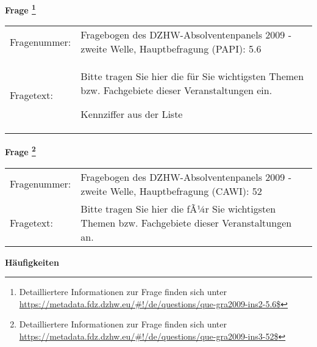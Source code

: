 				\vspace*{0.5cm}
                \noindent\textbf{Frage
	                \footnote{Detailliertere Informationen zur Frage finden sich unter
		              \url{https://metadata.fdz.dzhw.eu/\#!/de/questions/que-gra2009-ins2-5.6$}}}\\
				\begin{tabularx}{\hsize}{@{}lX}
					Fragenummer: &
					  Fragebogen des DZHW-Absolventenpanels 2009 - zweite Welle, Hauptbefragung (PAPI):
					  5.6
 \\
					Fragetext: & Bitte tragen Sie hier die für Sie wichtigsten Themen bzw. Fachgebiete dieser Veranstaltungen ein.\par  Kennziffer aus der Liste \\
				\end{tabularx}
				\vspace*{0.5cm}
                \noindent\textbf{Frage
	                \footnote{Detailliertere Informationen zur Frage finden sich unter
		              \url{https://metadata.fdz.dzhw.eu/\#!/de/questions/que-gra2009-ins3-52$}}}\\
				\begin{tabularx}{\hsize}{@{}lX}
					Fragenummer: &
					  Fragebogen des DZHW-Absolventenpanels 2009 - zweite Welle, Hauptbefragung (CAWI):
					  52
 \\
					Fragetext: & Bitte tragen Sie hier die fÃ¼r Sie wichtigsten Themen bzw. Fachgebiete dieser Veranstaltungen an. \\
				\end{tabularx}





        		\vspace*{0.5cm}
                \noindent\textbf{Häufigkeiten}

